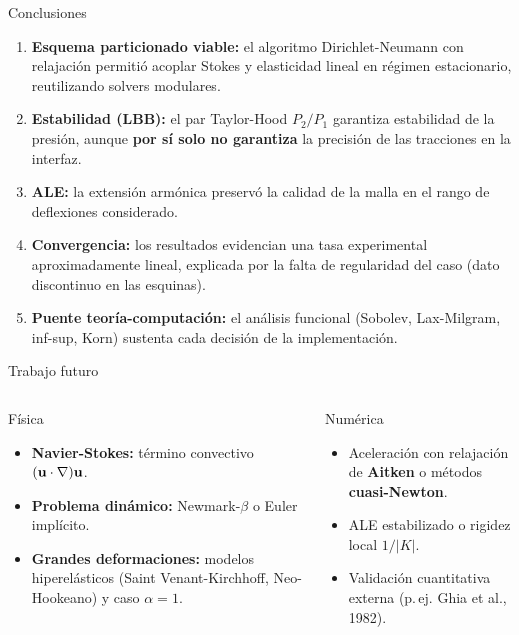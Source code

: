 \begin{frame}{Conclusiones}
  \begin{enumerate}
    \item \textbf{Esquema particionado viable:} el algoritmo Dirichlet-Neumann con relajación permitió acoplar Stokes y elasticidad lineal en régimen estacionario, reutilizando solvers modulares.
    \item \textbf{Estabilidad (LBB):} el par Taylor-Hood $P_2/P_1$ garantiza estabilidad de la presión, aunque \textbf{por sí solo no garantiza} la precisión de las tracciones en la interfaz.
    \item \textbf{ALE:} la extensión armónica preservó la calidad de la malla en el rango de deflexiones considerado.
    \item \textbf{Convergencia:} los resultados evidencian una tasa experimental aproximadamente lineal, explicada por la falta de regularidad del caso (dato discontinuo en las esquinas).
    \item \textbf{Puente teoría-computación:} el análisis funcional (Sobolev, Lax-Milgram, inf-sup, Korn) sustenta cada decisión de la implementación.
  \end{enumerate}
\end{frame}
\begin{frame}{Trabajo futuro}
  \begin{columns}[T]
      \begin{exampleblock}{Física}
        \begin{itemize}\small
          \item \textbf{Navier-Stokes:} término convectivo $(\mathbf{u}\cdot\nabla)\mathbf{u}$.
          \item \textbf{Problema dinámico:} Newmark-$\beta$ o Euler implícito.
          \item \textbf{Grandes deformaciones:} modelos hiperelásticos (Saint Venant-Kirchhoff, Neo-Hookeano) y caso $\alpha = 1$.
        \end{itemize}
      \end{exampleblock}
      \begin{exampleblock}{Numérica}
        \begin{itemize}\small
          \item Aceleración con relajación de \textbf{Aitken} o métodos \textbf{cuasi-Newton}.
          \item ALE estabilizado o rigidez local $1/|K|$.
          \item Validación cuantitativa externa (p.\,ej. Ghia et al., 1982).
        \end{itemize}
      \end{exampleblock}
  \end{columns}
\end{frame}
